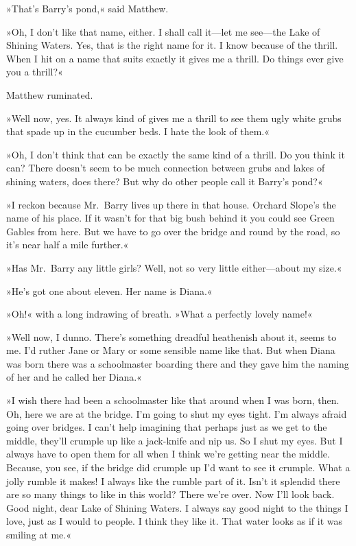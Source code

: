 »That's Barry's pond,« said Matthew.

»Oh, I don't like that name, either. I shall call it—let me see—the Lake of Shining Waters. Yes, that is the right name for it. I know because of the thrill. When I hit on a name that suits exactly it gives me a thrill. Do things ever give you a thrill?«

Matthew ruminated.

»Well now, yes. It always kind of gives me a thrill to see them ugly white grubs that spade up in the cucumber beds. I hate the look of them.«

»Oh, I don't think that can be exactly the same kind of a thrill. Do you think it can? There doesn't seem to be much connection between grubs and lakes of shining waters, does there? But why do other people call it Barry's pond?«

»I reckon because Mr.~Barry lives up there in that house. Orchard Slope's the name of his place. If it wasn't for that big bush behind it you could see Green Gables from here. But we have to go over the bridge and round by the road, so it's near half a mile further.«

»Has Mr.~Barry any little girls? Well, not so very little either—about my size.«

»He's got one about eleven. Her name is Diana.«

»Oh!« with a long indrawing of breath. »What a perfectly lovely name!«

»Well now, I dunno. There's something dreadful heathenish about it, seems to me. I'd ruther Jane or Mary or some sensible name like that. But when Diana was born there was a schoolmaster boarding there and they gave him the naming of her and he called her Diana.«

»I wish there had been a schoolmaster like that around when I was born, then. Oh, here we are at the bridge. I'm going to shut my eyes tight. I'm always afraid going over bridges. I can't help imagining that perhaps just as we get to the middle, they'll crumple up like a jack-knife and nip us. So I shut my eyes. But I always have to open them for all when I think we're getting near the middle. Because, you see, if the bridge did crumple up I'd want to see it crumple. What a jolly rumble it makes! I always like the rumble part of it. Isn't it splendid there are so many things to like in this world? There we're over. Now I'll look back. Good night, dear Lake of Shining Waters. I always say good night to the things I love, just as I would to people. I think they like it. That water looks as if it was smiling at me.«

